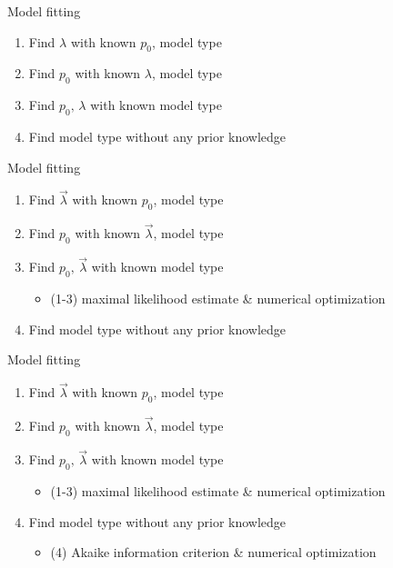 \documentclass[american]{beamer}
\begin{document}
    \begin{frame}{Model fitting}
        \begin{enumerate}
            \item Find $\lambda$ with known $p_{0}$, model type
            \item Find $p_{0}$ with known $\lambda$, model type
            \item Find $p_{0},\,\lambda$ with known model type
            \item Find model type without any prior knowledge
        \end{enumerate}
    \end{frame}

    \begin{frame}{Model fitting}
        \begin{enumerate}
            \item Find $\overrightarrow{\lambda}$ with known $p_{0}$, model type
            \item Find $p_{0}$ with known $\overrightarrow{\lambda}$, model type
            \item Find $p_{0},\,\overrightarrow{\lambda}$ with known model type
            \begin{itemize}
                \item (1-3) maximal likelihood estimate \& numerical optimization
            \end{itemize}
            \item Find model type without any prior knowledge
        \end{enumerate}
    \end{frame}

    \begin{frame}{Model fitting}
        \begin{enumerate}
            \item Find $\overrightarrow{\lambda}$ with known $p_{0}$, model type
            \item Find $p_{0}$ with known $\overrightarrow{\lambda}$, model type
            \item Find $p_{0},\,\overrightarrow{\lambda}$ with known model type
            \begin{itemize}
                \item (1-3) maximal likelihood estimate \& numerical optimization
            \end{itemize}
            \item Find model type without any prior knowledge
            \begin{itemize}
                \item (4) Akaike information criterion \& numerical optimization
            \end{itemize}
        \end{enumerate}
    \end{frame}
\end{document}
